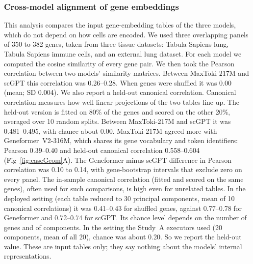 \subsubsection*{Cross-model alignment of gene embeddings}
This analysis compares the input gene-embedding tables of the three
models, which do not depend on how cells are encoded. We used three
overlapping panels of 350 to 382 genes, taken from three tissue
datasets: Tabula Sapiens lung, Tabula Sapiens immune cells, and an
external lung dataset. For each model we computed the cosine similarity
of every gene pair. We then took the Pearson correlation between two
models' similarity matrices. Between MaxToki-217M and scGPT this
correlation was 0.26--0.28. When genes were shuffled it was 0.00 (mean;
SD 0.004). We also report a held-out canonical correlation. Canonical
correlation measures how well linear projections of the two tables line
up. The held-out version is fitted on 80\% of the genes and scored on
the other 20\%, averaged over 10 random splits. Between MaxToki-217M and
scGPT it was 0.481--0.495, with chance about 0.00. MaxToki-217M agreed
more with Geneformer~V2-316M, which shares its gene vocabulary and token
identifiers: Pearson 0.39--0.40 and held-out canonical correlation
0.558--0.604 (Fig~\ref{fig:caseGeom}A).
The Geneformer-minus-scGPT difference in Pearson correlation was 0.10 to
0.14, with gene-bootstrap intervals that exclude zero on every panel. The
in-sample canonical correlation (fitted and scored on the same genes),
often used for such comparisons, is high even for unrelated tables. In
the deployed setting (each table reduced to 30 principal components, mean
of 10 canonical correlations) it was 0.41--0.43 for shuffled genes,
against 0.77--0.78 for Geneformer and 0.72--0.74 for scGPT. Its chance
level depends on the number of genes and of components. In the setting
the Study~A executors used (20 components, mean of all 20), chance was
about 0.20. So we report the held-out value. These are input tables only; they say nothing
about the models' internal representations.

